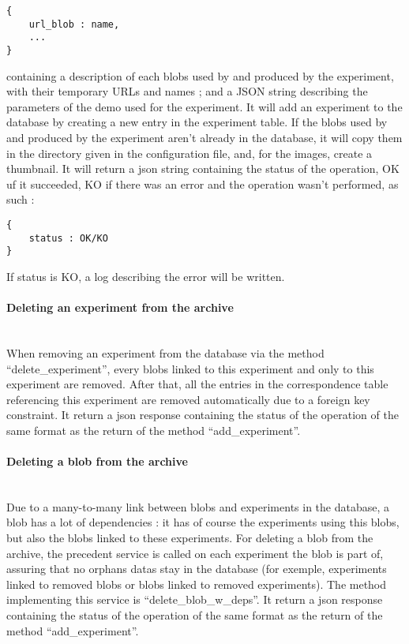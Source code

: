 \begin{verbatim}
{
    url_blob : name,
    ...
}
\end{verbatim}

containing a description of each blobs used by and produced by the experiment, with their temporary URLs and names ; and a JSON string describing the parameters of the demo used for the experiment. It will add an experiment to the database by creating a new entry in the experiment table. If the blobs used by and produced by the experiment aren't already in the database, it will copy them in the directory given in the configuration file, and, for the images, create a thumbnail. It will return a json string containing the status of the operation, OK uf it succeeded, KO if there was an error and the operation wasn't performed, as such :

\begin{verbatim}
{
    status : OK/KO
}
\end{verbatim}

If status is KO, a log describing the error will be written.

\paragraph{Deleting an experiment from the archive} \hspace{0pt} \\
When removing an experiment from the database via the method ``delete\_experiment'', every blobs linked to this experiment and only to this experiment are removed. After that, all the entries in the correspondence table referencing this experiment are removed automatically due to a foreign key constraint. It return a json response containing the status of the operation of the same format as the return of the method ``add\_experiment''.

\paragraph{Deleting a blob from the archive} \hspace{0pt} \\
Due to a many-to-many link between blobs and experiments in the database, a blob has a lot of dependencies : it has of course the experiments using this blobs, but also the blobs linked to these experiments. For deleting a blob from the archive, the precedent service is called on each experiment the blob is part of, assuring that no orphans datas stay in the database (for exemple, experiments linked to removed blobs or blobs linked to removed experiments). The method implementing this service is ``delete\_blob\_w\_deps''. It return a json response containing the status of the operation of the same format as the return of the method ``add\_experiment''.

